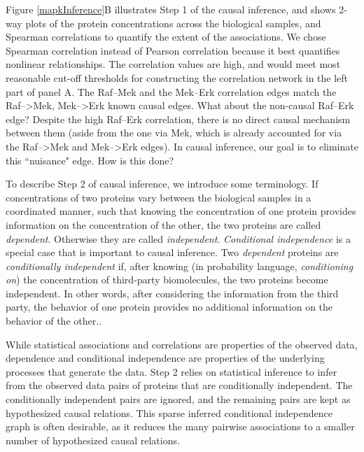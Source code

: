 \documentclass[journal=jacsat,manuscript=article]{achemso}
\def\added#1{{\color{blue} #1}}
\begin{document}
Figure \ref{mapkInference}B illustrates Step 1 of the causal inference, and shows 2-way plots of the protein concentrations across the biological samples, and Spearman correlations to quantify the extent of the associations. \added{We chose Spearman correlation instead of Pearson correlation because it best quantifies nonlinear relationships.}  The correlation values are high, and would meet most reasonable cut-off thresholds for constructing the correlation network in the left part of panel A.  The Raf--Mek and the Mek--Erk correlation edges match the Raf-->Mek, Mek-->Erk known causal edges.  What about the non-causal Raf--Erk edge? Despite the high Raf--Erk correlation, there is no direct causal mechanism between them (aside from the one via Mek, which is already accounted for via the Raf-->Mek and Mek-->Erk edges).  In causal  inference, our goal is to eliminate this ``nuisance" edge.  How is this done?

\added{To describe Step 2 of causal inference, we introduce some terminology. If concentrations of two proteins vary between the biological samples in a coordinated manner, such that knowing the concentration of one protein provides information on the concentration of the other, the two proteins are called {\it dependent}. Otherwise they are called {\it independent}. {\it Conditional independence} is a special case that is important to causal inference.  Two {\it dependent} proteins are {\it conditionally independent} if, after knowing (in probability language, {\it conditioning on}) the concentration of third-party biomolecules, the two proteins become independent. In other words, after considering the information from the third party, the behavior of one protein provides no additional information on the behavior of the other.}. 

\added{While statistical associations and correlations are properties of the observed data, dependence and conditional independence are properties of the underlying processes that generate the data. Step 2 relies on statistical inference\cite{pearl2009causality,markowetz2007inferring} to infer from the observed data pairs of proteins that are conditionally independent. The conditionally independent pairs are ignored, and the remaining pairs are kept as hypothesized causal relations. This sparse inferred conditional independence graph is often desirable, as it reduces the many pairwise associations to a smaller number of hypothesized causal relations.}
\end{document}

